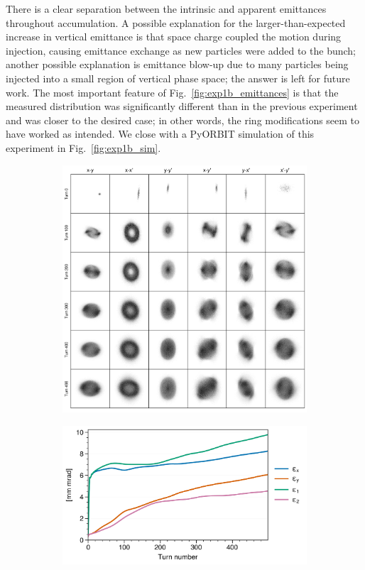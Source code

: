 %
There is a clear separation between the intrinsic and apparent emittances throughout accumulation. A possible explanation for the larger-than-expected increase in vertical emittance is that space charge coupled the motion during injection, causing emittance exchange as new particles were added to the bunch; another possible explanation is emittance blow-up due to many particles being injected into a small region of vertical phase space; the answer is left for future work. The most important feature of Fig.~\ref{fig:exp1b_emittances} is that the measured distribution was significantly different than in the previous experiment and was closer to the desired case; in other words, the ring modifications seem to have worked as intended. We close with a PyORBIT simulation of this experiment in Fig.~\ref{fig:exp1b_sim}. 
%
\begin{figure}[!p]
    \centering
    \begin{subfigure}{\textwidth}
        \includegraphics[width=\textwidth]{Images/chapter5/exp1b/sim_snapshots.png}
    \end{subfigure}
    \vfill
    \vspace*{1.0cm}
    \vfill
    \begin{subfigure}{0.7\textwidth}
        \includegraphics[width=\textwidth]{Images/chapter5/exp1b/sim_emittances.png}

\end{subfigure}
\end{figure}
